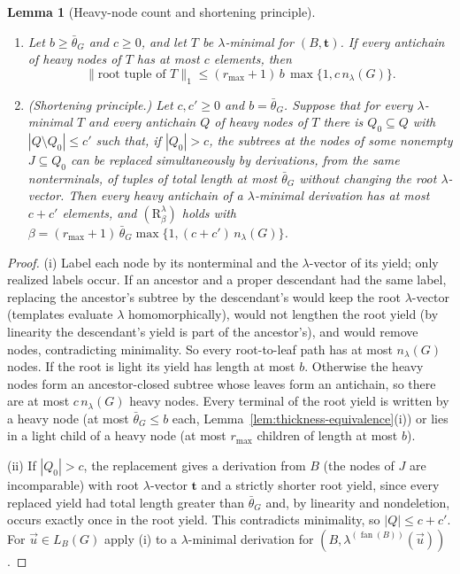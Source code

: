 \documentclass[11pt]{article}
\numberwithin{equation}{section}
\theoremstyle{plain}
\newtheorem{lemma}[theorem]{Lemma}
\theoremstyle{definition}
\theoremstyle{remark}
\newcommand{\tuple}[1]{\vec{#1}}
\newcommand{\fan}{\operatorname{fan}}
\theoremstyle{plain}
\begin{document}
\begin{lemma}[Heavy-node count and shortening principle]
\label{lem:heavy-node-count}
\begin{enumerate}[label=\textup{(\roman*)},leftmargin=*]
\item Let $b\ge\bar\theta_G$ and $c\ge0$, and let $T$ be $\lambda$-minimal for
$(B,\mathbf t)$.  If every antichain of heavy nodes of $T$ has at most $c$
elements, then
\[
 \|\text{root tuple of }T\|_1\le(r_{\max}+1)\,b\,\max\{1,c\,n_\lambda(G)\}.
\]
\item \emph{(Shortening principle.)}  Let $c,c'\ge0$ and $b=\bar\theta_G$.  Suppose that
for every $\lambda$-minimal $T$ and every antichain $Q$ of heavy nodes of $T$ there is
$Q_0\subseteq Q$ with $|Q\setminus Q_0|\le c'$ such that, if $|Q_0|>c$, the subtrees at
the nodes of some nonempty $J\subseteq Q_0$ can be replaced simultaneously by
derivations, from the same nonterminals, of tuples of total length at most
$\bar\theta_G$ without changing the root $\lambda$-vector.  Then every heavy antichain of
a $\lambda$-minimal derivation has at most $c+c'$ elements, and
$(\mathrm R_\beta^\lambda)$ holds with
$\beta=(r_{\max}+1)\,\bar\theta_G\max\{1,(c+c')\,n_\lambda(G)\}$.
\end{enumerate}
\end{lemma}

\begin{proof}
(i) Label each node by its nonterminal and the $\lambda$-vector of its yield; only
realized labels occur.  If an ancestor and a proper descendant had the same
label, replacing the ancestor's subtree by the descendant's would keep the root
$\lambda$-vector (templates evaluate $\lambda$ homomorphically), would not
lengthen the root yield (by linearity the descendant's yield is part of the
ancestor's), and would remove nodes, contradicting minimality.  So every
root-to-leaf path has at most $n_\lambda(G)$ nodes.  If the root is light its yield has
length at most $b$.  Otherwise the heavy nodes form an ancestor-closed subtree
whose leaves form an antichain, so there are at most $c\,n_\lambda(G)$ heavy nodes.
Every terminal of the root yield is written by a heavy node (at most
$\bar\theta_G\le b$ each, Lemma~\ref{lem:thickness-equivalence}(i)) or lies in a
light child of a heavy node (at most $r_{\max}$ children of length at most $b$).

(ii) If $|Q_0|>c$, the replacement gives a derivation from $B$ (the nodes of $J$ are
incomparable) with root $\lambda$-vector $\mathbf t$ and a strictly shorter root yield,
since every replaced yield had total length greater than $\bar\theta_G$ and, by
linearity and nondeletion, occurs exactly once in the root yield.  This contradicts
minimality, so $|Q|\le c+c'$.  For $\tuple u\in L_B(G)$ apply (i) to a $\lambda$-minimal
derivation for $(B,\lambda^{(\fan(B))}(\tuple u))$.
\end{proof}
\end{document}
